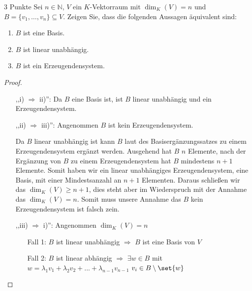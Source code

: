 \documentclass{problemset}
\author{Michael van Straten}
\begin{document}
\maketitle

\begin{problem}{3 Punkte}
Sei $n \in \mathbb{N}$, $V$ ein $K$-Vektorraum mit $\dim_K(V) = n$ und $B = \{v_1, \ldots, v_n\} \subseteq V$. Zeigen Sie, dass die folgenden Aussagen äquivalent sind:
\begin{enumerate}
    \item $B$ ist eine Basis.
    \item $B$ ist linear unabhängig.
    \item $B$ ist ein Erzeugendensystem.
\end{enumerate}

\begin{proof}
    $ $

    \begin{itemize}
        \item [	,,i) $\Longrightarrow$ ii)'':]
              Da $B$ eine Basis ist, ist $B$ linear unabhängig und ein Erzeugendensystem.
        \item [,,ii) $\Longrightarrow$ iii)'':]
              Angenommen $B$ ist kein Erzeugendensystem.

              Da $B$ linear unabhängig ist kann $B$ laut des
              Basisergänzungssatzes zu einem Erzeugendensystem ergänzt werden.
              Ausgehend hat $B$ $n$ Elemente, nach der Ergänzung von $B$ zu
              einem Erzeugendensystem hat $B$ mindestens $n + 1$ Elemente.
              Somit haben wir ein linear unabhängiges Erzeugendensystem, eine
              Basis, mit einer Mindestsanzahl an $n + 1$ Elementen. Daraus
              schließen wir das $\dim_K(V) \ge n + 1$, dies steht aber im
              Wiederspruch mit der Annahme das $\dim_K(V) = n$. Somit muss
              unsere Annahme das $B$ kein Erzeugendensystem ist falsch zein.
              \checkmark
        \item [	,,iii) $\Longrightarrow$ i)'':] Angenommen $\dim_K(V) = n$
              \begin{itemize}
                  \item [Fall 1:]
                        $B$ ist linear unabhängig $\Rightarrow$ $B$ ist eine Basis von $V$ \checkmark
                  \item [Fall 2:]
                        $B$ ist linear abhängig $\Rightarrow$ $\exists w \in B$ mit $w = \lambda_1 v_1 + \lambda_2 v_2 + ... + \lambda_{n-1} v_{n - 1}$ $v_i \in B \setminus \set{w}$


\end{itemize}
\end{itemize}
\end{proof}
\end{problem}
\end{document}
